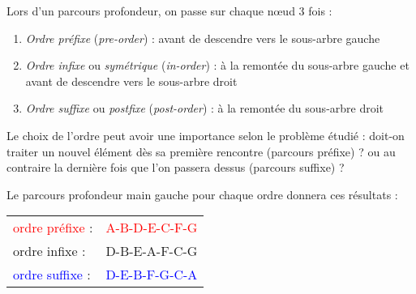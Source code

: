 \documentclass[11pt,a4paper]{article}
\begin{document}
\begin{center}
\end{center}

\vfillLast

Lors d'un parcours profondeur, on passe sur chaque nœud 3 fois :

\begin{enumerate}
\item \textit{Ordre préfixe} (\textit{pre-order}) : avant de descendre vers le sous-arbre gauche
\item \textit{Ordre infixe} ou \textit{symétrique} (\textit{in-order}) : à la remontée du sous-arbre gauche et avant de descendre vers le sous-arbre droit
\item \textit{Ordre suffixe} ou \textit{postfixe} (\textit{post-order}) :  à la remontée du sous-arbre droit
\end{enumerate}

Le choix de l'ordre peut avoir une importance selon le problème étudié : doit-on traiter un nouvel élément dès sa première rencontre (parcours préfixe) ? ou au contraire la dernière fois que l'on passera dessus (parcours suffixe) ?

\medskip

Le parcours profondeur main gauche pour chaque ordre donnera ces résultats :

\medskip

\begin{tabular}{l l}
\textcolor{red}{ordre préfixe} : & \textcolor{red}{A-B-D-E-C-F-G} \\
\textcolor{green(htmlcssgreen)}{ordre infixe} :  & \textcolor{green(htmlcssgreen)}{D-B-E-A-F-C-G} \\
\textcolor{blue}{ordre suffixe} : & \textcolor{blue}{D-E-B-F-G-C-A} \\
\end{tabular}
\end{document}
